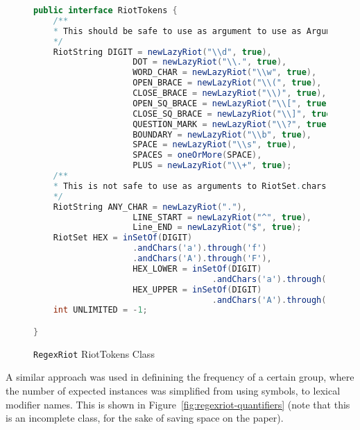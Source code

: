 \documentclass[conference]{IEEEtran}
\begin{document}
\begin{figure}[htbp]
    \centering
    \label{fig:regexriot-riot-tokens}
    \begin{lstlisting}[language=Java]
public interface RiotTokens {
    /**
    * This should be safe to use as argument to use as Argument to RiotSet.chars()
    */
    RiotString DIGIT = newLazyRiot("\\d", true),
                    DOT = newLazyRiot("\\.", true),
                    WORD_CHAR = newLazyRiot("\\w", true),
                    OPEN_BRACE = newLazyRiot("\\(", true),
                    CLOSE_BRACE = newLazyRiot("\\)", true),
                    OPEN_SQ_BRACE = newLazyRiot("\\[", true),
                    CLOSE_SQ_BRACE = newLazyRiot("\\]", true),
                    QUESTION_MARK = newLazyRiot("\\?", true),
                    BOUNDARY = newLazyRiot("\\b", true),
                    SPACE = newLazyRiot("\\s", true),
                    SPACES = oneOrMore(SPACE),
                    PLUS = newLazyRiot("\\+", true);
    /**
    * This is not safe to use as arguments to RiotSet.chars()
    */
    RiotString ANY_CHAR = newLazyRiot("."),
                    LINE_START = newLazyRiot("^", true),
                    Line_END = newLazyRiot("$", true);
    RiotSet HEX = inSetOf(DIGIT)
                    .andChars('a').through('f')
                    .andChars('A').through('F'),
                    HEX_LOWER = inSetOf(DIGIT)
                                    .andChars('a').through('f'),
                    HEX_UPPER = inSetOf(DIGIT)
                                    .andChars('A').through('F');
    int UNLIMITED = -1;

}
            \end{lstlisting}
    \caption{\texttt{RegexRiot} RiotTokens Class}
\end{figure}

A similar approach was used in definining the frequency of a certain group,
where the number of expected instances was simplified from using symbols,
to lexical modifier names. This is shown in Figure~\ref{fig:regexriot-quantifiers}
(note that this is an incomplete class, for the sake of saving space
on the paper).
\end{document}
